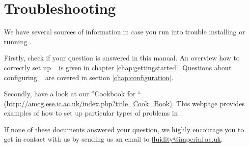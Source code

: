 \chapter{Troubleshooting}

We have several sources of information in case you run into trouble installing or running \fluidity.

Firstly, check if your question is answered in this manual. An overview how to correctly set up \fluidity \mbox{ } is given in chapter \ref{chap:gettingstarted}.
Questions about configuring \fluidity\mbox{ } are covered in section \ref{chap:configuration}.

Secondly, have a look at our ''Cookbook for \fluidity`` (\url{http://amcg.ese.ic.ac.uk/index.php?title=Cook_Book}). This webpage provides examples of how to set up particular types of problems in \fluidity. 

If none of these documents answered your question, we highly encourage you to get in contact with us by sending us an email to \url{fluidity@imperial.ac.uk}.
